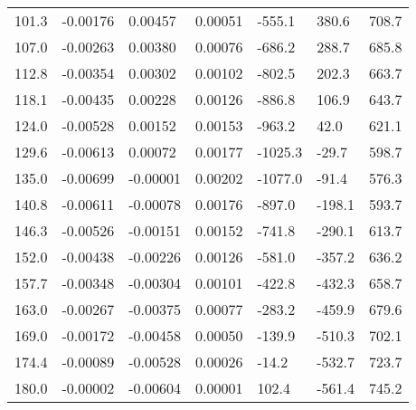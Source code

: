 \begin{table}[htbp]
\begin{tabular}{p{1.5cm}p{1.5cm}p{1.5cm}p{1.5cm}p{1.5cm}p{1.5cm}p{1.5cm}}
    101.3  & -0.00176  & 0.00457  & 0.00051  & -555.1  & 380.6  & 708.7  \\
    107.0  & -0.00263  & 0.00380  & 0.00076  & -686.2  & 288.7  & 685.8  \\
    112.8  & -0.00354  & 0.00302  & 0.00102  & -802.5  & 202.3  & 663.7  \\
    118.1  & -0.00435  & 0.00228  & 0.00126  & -886.8  & 106.9  & 643.7  \\
    124.0  & -0.00528  & 0.00152  & 0.00153  & -963.2  & 42.0  & 621.1  \\
    129.6  & -0.00613  & 0.00072  & 0.00177  & -1025.3  & -29.7  & 598.7  \\
    135.0  & -0.00699  & -0.00001  & 0.00202  & -1077.0  & -91.4  & 576.3  \\
    140.8  & -0.00611  & -0.00078  & 0.00176  & -897.0  & -198.1  & 593.7  \\
    146.3  & -0.00526  & -0.00151  & 0.00152  & -741.8  & -290.1  & 613.7  \\
    152.0  & -0.00438  & -0.00226  & 0.00126  & -581.0  & -357.2  & 636.2  \\
    157.7  & -0.00348  & -0.00304  & 0.00101  & -422.8  & -432.3  & 658.7  \\
    163.0  & -0.00267  & -0.00375  & 0.00077  & -283.2  & -459.9  & 679.6  \\
    169.0  & -0.00172  & -0.00458  & 0.00050  & -139.9  & -510.3  & 702.1  \\
    174.4  & -0.00089  & -0.00528  & 0.00026  & -14.2  & -532.7  & 723.7  \\
    180.0  & -0.00002  & -0.00604  & 0.00001  & 102.4  & -561.4  & 745.2  \\
    \bottomrule
    \end{tabular}%
  \label{Tab:stress_strain_7046}%
\end{table}%

